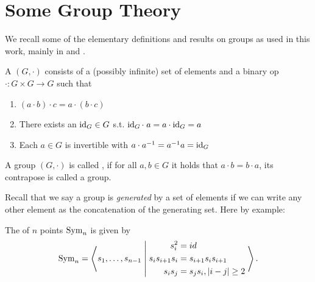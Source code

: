 \section{Some Group Theory}
\label{app:gen:groups}

We recall some of the elementary definitions and results on groups as used in
this work, mainly in  and
.

\begin{definition}
    A \emph{} $(G,\cdot)$ consists of a (possibly infinite) set of
    elements and a binary op $\cdot : G \times G \to G$ such that
    \begin{enumerate}
        \item $(a \cdot b) \cdot c = a \cdot (b \cdot c)$
        \item There exists an $\operatorname{id}_G \in G$ s.t. $\operatorname{id}_G \cdot\;a = a \cdot \operatorname{id}_G = a$
        \item Each $a \in G$ is invertible with $a \cdot a^{-1} = a^{-1} a =
        \operatorname{id}_G$
    \end{enumerate}
\end{definition}

\begin{definition}
    A group $(G,\cdot)$ is called \emph{}, if for all $a,b \in G$
    it holds that $a \cdot b = b \cdot a$, its contrapose is called a
    \emph{} group.
\end{definition}

Recall that we say a group is \emph{generated} by a set of elements if we can
write any other element as the concatenation of the generating set. Here by
example:

\begin{definition}
    The \emph{} of $n$ points $\mathrm{Sym}_n$ is given by
    \begin{equation}\label{app:eq:symmetricGroup}
        \mathrm{Sym}_n
        = 
        \left\langle 
        s_1, \ldots, s_{n-1} 
        \;\middle\vert\;    
        \begin{aligned}
            s_i^2 &= id \\
            s_i s_{i+1} s_i &= s_{i+1} s_i s_{i+1} \\
            s_i s_j &= s_j s_i, \vert i - j \vert \geq 2
        \end{aligned}
        \;\right\rangle.
    \end{equation}
\end{definition}

